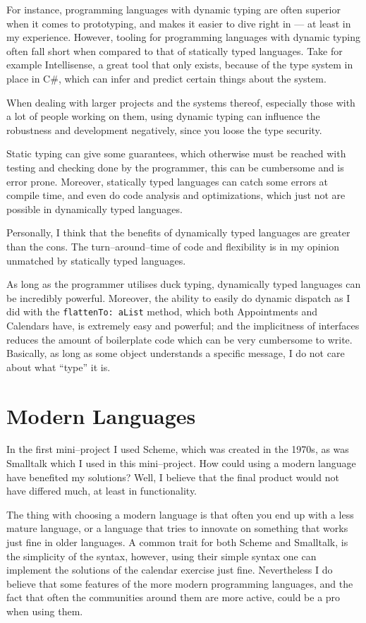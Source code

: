 For instance, programming languages with dynamic typing are often superior when it comes to prototyping, and makes it easier to dive right in --- at least in my experience.
However, tooling for programming languages with dynamic typing often fall short when compared to that of statically typed languages.
Take for example Intellisense, a great tool that only exists, because of the type system in place in C\#, which can infer and predict certain things about the system.

\bigskip
When dealing with larger projects and the systems thereof, especially those with a lot of people working on them,
using dynamic typing can influence the robustness and development negatively, since you loose the type security.

Static typing can give some guarantees, which otherwise must be reached with testing and checking done by the programmer, this can be cumbersome and is error prone.
Moreover, statically typed languages can catch some errors at compile time, and even do code analysis and optimizations, which just not are possible in dynamically typed languages.

\bigskip
Personally, I think that the benefits of dynamically typed languages are greater than the cons.
The turn--around--time of code and flexibility is in my opinion unmatched by statically typed languages.

As long as the programmer utilises duck typing, dynamically typed languages can be incredibly powerful.
Moreover, the ability to easily do dynamic dispatch as I did with the \texttt{flattenTo: aList} method, which both Appointments and Calendars have,
is extremely easy and powerful; and the implicitness of interfaces reduces the amount of boilerplate code which can be very cumbersome to write.
Basically, as long as some object understands a specific message, I do not care about what \enquote{type} it is.

\section{Modern Languages}
In the first mini--project I used Scheme, which was created in the 1970s, as was Smalltalk which I used in this mini--project.
How could using a modern language have benefited my solutions?
Well, I believe that the final product would not have differed much, at least in functionality.

The thing with choosing a modern language is that often you end up with a less mature language, or a language that tries to innovate on something that works just fine in older languages.
A common trait for both Scheme and Smalltalk, is the simplicity of the syntax, however, using their simple syntax one can implement the solutions of the calendar exercise just fine.
Nevertheless I do believe that some features of the more modern programming languages, and the fact that often the communities around them are more active, could be a pro when using them.

